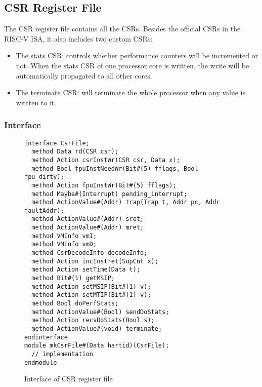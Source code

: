 \subsection{CSR Register File}
The CSR register file contains all the CSRs.
Besides the official CSRs in the RISC-V ISA, it also includes two custom CSRs:
\begin{itemize}
    \item The stats CSR: controls whether performance counters will be incremented or not.
    When the stats CSR of one processor core is written, the write will be automatically propagated to all other cores.
    \item The terminate CSR: will terminate the whole processor when any value is written to it.
\end{itemize}

\subsubsection{Interface}

\begin{figure}
\begin{lstlisting}[caption={}]
interface CsrFile;
  method Data rd(CSR csr);
  method Action csrInstWr(CSR csr, Data x);
  method Bool fpuInstNeedWr(Bit#(5) fflags, Bool fpu_dirty);
  method Action fpuInstWr(Bit#(5) fflags);
  method Maybe#(Interrupt) pending_interrupt;
  method ActionValue#(Addr) trap(Trap t, Addr pc, Addr faultAddr);
  method ActionValue#(Addr) sret;
  method ActionValue#(Addr) mret;
  method VMInfo vmI;
  method VMInfo vmD;
  method CsrDecodeInfo decodeInfo;
  method Action incInstret(SupCnt x);
  method Action setTime(Data t);
  method Bit#(1) getMSIP;
  method Action setMSIP(Bit#(1) v);
  method Action setMTIP(Bit#(1) v);
  method Bool doPerfStats;
  method ActionValue#(Bool) sendDoStats;
  method Action recvDoStats(Bool s);
  method ActionValue#(void) terminate;
endinterface
module mkCsrFile#(Data hartid)(CsrFile);
  // implementation
endmodule
\end{lstlisting}
\caption{Interface of CSR register file}\label{fig:csr-file-ifc}
\end{figure}

